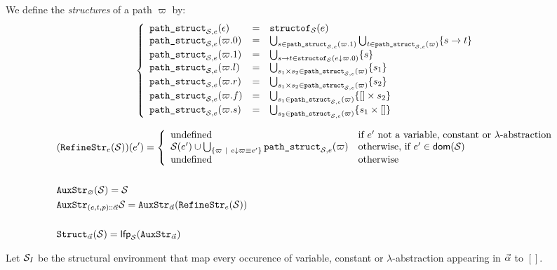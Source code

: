 \documentclass[a4paper]{article}
\theoremstyle{definition}
\begin{document}
    We define the \textit{structures} of a path $\varpi$ by:
    \[
      \left\{
        \begin{array}{lcl}
          \texttt{path\_struct}_{\mathcal{S},e}(\epsilon) & = & \texttt{structof}_{\mathcal{S}}(e) \\
          \texttt{path\_struct}_{\mathcal{S},e}(\varpi.0) & = & \bigcup_{s\in\texttt{path\_struct}_{\mathcal{S},e}(\varpi.1)} \bigcup_{t\in\texttt{path\_struct}_{\mathcal{S},e}(\varpi)} \{s\to t\} \\
          \texttt{path\_struct}_{\mathcal{S},e}(\varpi.1) & = & \bigcup_{s\to t\in\texttt{structof}_{\mathcal{S}}(e{\downarrow}\varpi.0)} \{s\}\\
          \texttt{path\_struct}_{\mathcal{S},e}(\varpi.l) & = & \bigcup_{s_1\times s_2\in\texttt{path\_struct}_{\mathcal{S},e}(\varpi)} \{s_1\} \\
          \texttt{path\_struct}_{\mathcal{S},e}(\varpi.r) & = & \bigcup_{s_1\times s_2\in\texttt{path\_struct}_{\mathcal{S},e}(\varpi)} \{s_2\} \\
          \texttt{path\_struct}_{\mathcal{S},e}(\varpi.f) & = & \bigcup_{s_1\in\texttt{path\_struct}_{\mathcal{S},e}(\varpi)} \{{[}]\times s_2\} \\
          \texttt{path\_struct}_{\mathcal{S},e}(\varpi.s) & = & \bigcup_{s_2\in\texttt{path\_struct}_{\mathcal{S},e}(\varpi)} \{s_1\times {[}]\}
        \end{array}  
      \right.
    \]

    \begin{align*}
      &(\texttt{RefineStr}_{e}(\mathcal{S}))(e') = 
        \left\{\begin{array}{ll}
          \text{undefined} & \text{if } e' \text{ not a variable, constant or $\lambda$-abstraction}\\
          \mathcal{S}(e') \cup \bigcup_{\{\varpi ~|~ e{\downarrow}\varpi \equiv e'\}} \texttt{path\_struct}_{\mathcal{S},e}(\varpi) & \text{otherwise, if } e' \in \textsf{dom}(\mathcal{S})\\
          \text{undefined} & \text{otherwise}
        \end{array}\right.\\&\\
      &\texttt{AuxStr}_{\varnothing} (\mathcal{S}) = \mathcal{S}\\
      &\texttt{AuxStr}_{{(e,t,p)}\textsf{::}{\vec \alpha}} \mathcal{S} = \texttt{AuxStr}_{\vec \alpha} (\texttt{RefineStr}_{e}(\mathcal{S}))\\&\\
      &\texttt{Struct}_{\vec \alpha}(\mathcal{S})=\textsf{lfp}_{\mathcal{S}} (\texttt{AuxStr}_{\vec \alpha})
    \end{align*}

    Let $\mathcal{S}_I$ be the structural environment that map every occurence of variable, constant or $\lambda$-abstraction
    appearing in $\vec \alpha$ to $[]$.
\end{document}

